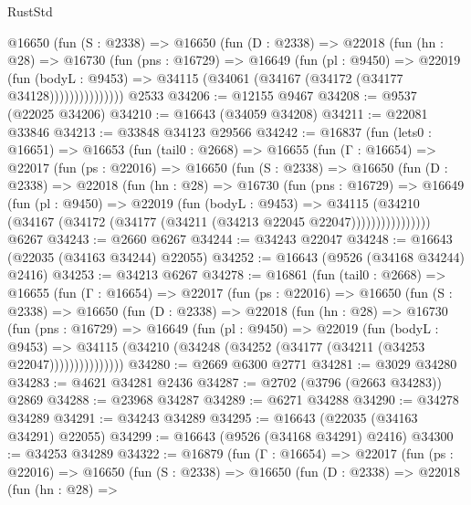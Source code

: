 \begin{lexlean}{RustStd}
\begin{coremodule}
            @16650
              (fun (S : @2338) =>
              @16650
                (fun (D : @2338) =>
                @22018
                  (fun (hn : @28) =>
                  @16730
                    (fun (pns : @16729) =>
                    @16649
                      (fun (pl : @9450) =>
                      @22019
                        (fun (bodyL : @9453) =>
                        @34115 (@34061 (@34167 (@34172 (@34177 @34128)))))))))))))))
    @2533
@34206 := @12155 @9467
@34208 := @9537 (@22025 @34206)
@34210 := @16643 (@34059 @34208)
@34211 := @22081 @33846
@34213 := @33848 @34123 @29566
@34242 := @16837
    (fun (lets0 : @16651) =>
    @16653
      (fun (tail0 : @2668) =>
      @16655
        (fun (Γ : @16654) =>
        @22017
          (fun (ps : @22016) =>
          @16650
            (fun (S : @2338) =>
            @16650
              (fun (D : @2338) =>
              @22018
                (fun (hn : @28) =>
                @16730
                  (fun (pns : @16729) =>
                  @16649
                    (fun (pl : @9450) =>
                    @22019
                      (fun (bodyL : @9453) =>
                      @34115
                        (@34210
                          (@34167 (@34172 (@34177 (@34211 (@34213 @22045 @22047))))))))))))))))
    @6267
@34243 := @2660 @6267
@34244 := @34243 @22047
@34248 := @16643 (@22035 (@34163 @34244) @22055)
@34252 := @16643 (@9526 (@34168 @34244) @2416)
@34253 := @34213 @6267
@34278 := @16861
    (fun (tail0 : @2668) =>
    @16655
      (fun (Γ : @16654) =>
      @22017
        (fun (ps : @22016) =>
        @16650
          (fun (S : @2338) =>
          @16650
            (fun (D : @2338) =>
            @22018
              (fun (hn : @28) =>
              @16730
                (fun (pns : @16729) =>
                @16649
                  (fun (pl : @9450) =>
                  @22019
                    (fun (bodyL : @9453) =>
                    @34115 (@34210 (@34248 (@34252 (@34177 (@34211 (@34253 @22047)))))))))))))))
@34280 := @2669 @6300 @2771
@34281 := @3029 @34280
@34283 := @4621 @34281 @2436
@34287 := @2702 (@3796 (@2663 @34283)) @2869
@34288 := @23968 @34287
@34289 := @6271 @34288
@34290 := @34278 @34289
@34291 := @34243 @34289
@34295 := @16643 (@22035 (@34163 @34291) @22055)
@34299 := @16643 (@9526 (@34168 @34291) @2416)
@34300 := @34253 @34289
@34322 := @16879
    (fun (Γ : @16654) =>
    @22017
      (fun (ps : @22016) =>
      @16650
        (fun (S : @2338) =>
        @16650
          (fun (D : @2338) =>
          @22018
            (fun (hn : @28) =>

\end{coremodule}
\end{lexlean}
